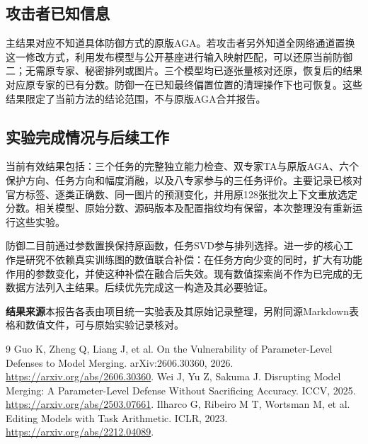 \documentclass[11pt,a4paper]{article}
\begin{document}
\subsection{攻击者已知信息}
主结果对应不知道具体防御方式的原版AGA。若攻击者另外知道全网络通道置换这一修改方式，利用发布模型与公开基座进行输入映射匹配，可以还原当前防御二；无需原专家、秘密排列或图片。三个模型均已逐张量核对还原，恢复后的结果对应原专家的已有分数。防御一在已知最终偏置位置的清理操作下也可恢复。这些结果限定了当前方法的结论范围，不与原版AGA合并报告。

\subsection{实验完成情况与后续工作}
当前有效结果包括：三个任务的完整独立能力检查、双专家TA与原版AGA、六个保护方向、任务方向和幅度消融，以及八专家参与的三任务评价。主要记录已核对官方标签、逐类正确数、同一图片的预测变化，并用原128张批次上下文重放选定分数。相关模型、原始分数、源码版本及配置指纹均有保留，本次整理没有重新运行这些实验。

防御二目前通过参数置换保持原函数，任务SVD参与排列选择。进一步的核心工作是研究不依赖真实训练图的数值联合补偿：在任务方向少变的同时，扩大有功能作用的参数变化，并使这种补偿在融合后失效。现有数值探索尚不作为已完成的无数据方法列入主结果。后续优先完成这一构造及其必要验证。

\vspace{4pt}
\noindent\textbf{结果来源}\quad 本报告各表由项目统一实验表及其原始记录整理，另附同源Markdown表格和数值文件，可与原始实验记录核对。

\begin{thebibliography}{9}
\small
{} Guo K, Zheng Q, Liang J, et al. On the Vulnerability of Parameter-Level Defenses to Model Merging. arXiv:2606.30360, 2026. \url{https://arxiv.org/abs/2606.30360}.
 Wei J, Yu Z, Sakuma J. Disrupting Model Merging: A Parameter-Level Defense Without Sacrificing Accuracy. ICCV, 2025. \url{https://arxiv.org/abs/2503.07661}.
 Ilharco G, Ribeiro M T, Wortsman M, et al. Editing Models with Task Arithmetic. ICLR, 2023. \url{https://arxiv.org/abs/2212.04089}.
\end{thebibliography}
\end{document}
